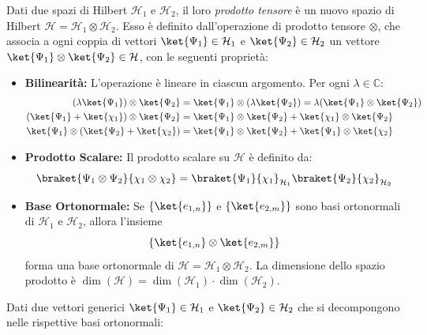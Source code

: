 \begin{definition}
    Dati due spazi di Hilbert \(\mathcal{H}_1\) e \(\mathcal{H}_2\), il loro \textit{prodotto tensore} è un nuovo spazio di Hilbert \(\mathcal{H} = \mathcal{H}_1 \otimes \mathcal{H}_2\).
    Esso è definito dall'operazione di prodotto tensore \(\otimes\), che associa a ogni coppia di vettori \(\ket{\Psi_1} \in \mathcal{H}_1\) e \(\ket{\Psi_2} \in \mathcal{H}_2\) un vettore \(\ket{\Psi_1} \otimes \ket{\Psi_2} \in \mathcal{H}\), con le seguenti proprietà:
    \begin{itemize}
        \item \textbf{Bilinearità:} L'operazione è lineare in ciascun argomento. Per ogni \(\lambda \in \mathbb{C}\):
        \begin{align*}
            (\lambda \ket{\Psi_1}) \otimes \ket{\Psi_2} &= \ket{\Psi_1} \otimes (\lambda \ket{\Psi_2}) = \lambda (\ket{\Psi_1} \otimes \ket{\Psi_2}) \\
            (\ket{\Psi_1} + \ket{\chi_1}) \otimes \ket{\Psi_2} &= \ket{\Psi_1} \otimes \ket{\Psi_2} + \ket{\chi_1} \otimes \ket{\Psi_2} \\
            \ket{\Psi_1} \otimes (\ket{\Psi_2} + \ket{\chi_2}) &= \ket{\Psi_1} \otimes \ket{\Psi_2} + \ket{\Psi_1} \otimes \ket{\chi_2}
        \end{align*}
        \item \textbf{Prodotto Scalare:} Il prodotto scalare su \(\mathcal{H}\) è definito da:
        \begin{equation}
            \braket{\Psi_1 \otimes \Psi_2}{\chi_1 \otimes \chi_2} = \braket{\Psi_1}{\chi_1}_{\mathcal{H}_1} \braket{\Psi_2}{\chi_2}_{\mathcal{H}_2}
        \end{equation}
        \item \textbf{Base Ortonormale:} Se \(\{\ket{e_{1,n}}\}\) e \(\{\ket{e_{2,m}}\}\) sono basi ortonormali di \(\mathcal{H}_1\) e \(\mathcal{H}_2\), allora l'insieme
        \begin{equation}
            \left\{ \ket{e_{1,n}} \otimes \ket{e_{2,m}} \right\}
        \end{equation}
        forma una base ortonormale di \(\mathcal{H} = \mathcal{H}_1 \otimes \mathcal{H}_2\). La dimensione dello spazio prodotto è \(\dim(\mathcal{H}) = \dim(\mathcal{H}_1) \cdot \dim(\mathcal{H}_2)\).
    \end{itemize}
\end{definition}
Dati due vettori generici \(\ket{\Psi_1} \in \mathcal{H}_1\) e \(\ket{\Psi_2} \in \mathcal{H}_2\) che si decompongono nelle rispettive basi ortonormali:
